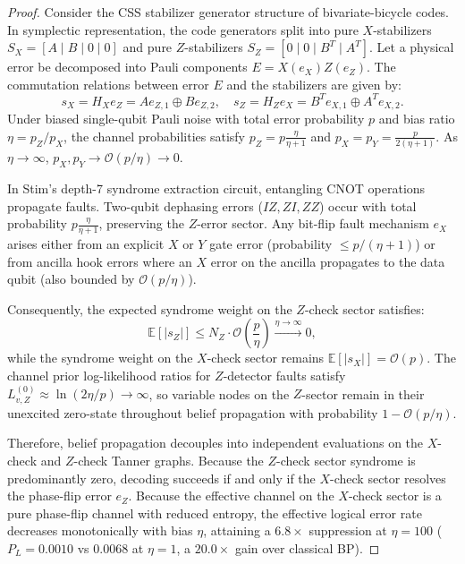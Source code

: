 \documentclass[journal]{IEEEtran}
\begin{document}
\begin{proof}
Consider the CSS stabilizer generator structure of bivariate-bicycle codes. In symplectic representation, the code generators split into pure $X$-stabilizers $S_X = [A \mid B \mid 0 \mid 0]$ and pure $Z$-stabilizers $S_Z = [0 \mid 0 \mid B^T \mid A^T]$. Let a physical error be decomposed into Pauli components $E = X(e_X) Z(e_Z)$. The commutation relations between error $E$ and the stabilizers are given by:
\begin{equation}
    s_X = H_X e_Z = A e_{Z,1} \oplus B e_{Z,2}, \quad s_Z = H_Z e_X = B^T e_{X,1} \oplus A^T e_{X,2}.
\end{equation}
Under biased single-qubit Pauli noise with total error probability $p$ and bias ratio $\eta = p_Z / p_X$, the channel probabilities satisfy $p_Z = p \frac{\eta}{\eta + 1}$ and $p_X = p_Y = \frac{p}{2(\eta + 1)}$. As $\eta \to \infty$, $p_X, p_Y \to \mathcal{O}(p/\eta) \to 0$.

In Stim's depth-7 syndrome extraction circuit, entangling CNOT operations propagate faults. Two-qubit dephasing errors ($IZ, ZI, ZZ$) occur with total probability $p \frac{\eta}{\eta+1}$, preserving the $Z$-error sector. Any bit-flip fault mechanism $e_X$ arises either from an explicit $X$ or $Y$ gate error (probability $\le p/(\eta+1)$) or from ancilla hook errors where an $X$ error on the ancilla propagates to the data qubit (also bounded by $\mathcal{O}(p/\eta)$).

Consequently, the expected syndrome weight on the $Z$-check sector satisfies:
\begin{equation}
    \mathbb{E}[|s_Z|] \le N_Z \cdot \mathcal{O}\left( \frac{p}{\eta} \right) \xrightarrow{\eta \to \infty} 0,
\end{equation}
while the syndrome weight on the $X$-check sector remains $\mathbb{E}[|s_X|] = \mathcal{O}(p)$. The channel prior log-likelihood ratios for $Z$-detector faults satisfy $L_{v, Z}^{(0)} \approx \ln(2\eta / p) \to \infty$, so variable nodes on the $Z$-sector remain in their unexcited zero-state throughout belief propagation with probability $1 - \mathcal{O}(p/\eta)$. 

Therefore, belief propagation decouples into independent evaluations on the $X$-check and $Z$-check Tanner graphs. Because the $Z$-check sector syndrome is predominantly zero, decoding succeeds if and only if the $X$-check sector resolves the phase-flip error $e_Z$. Because the effective channel on the $X$-check sector is a pure phase-flip channel with reduced entropy, the effective logical error rate decreases monotonically with bias $\eta$, attaining a $6.8\times$ suppression at $\eta = 100$ ($P_L = 0.0010$ vs $0.0068$ at $\eta=1$, a $20.0\times$ gain over classical BP).
\end{proof}
\end{document}
